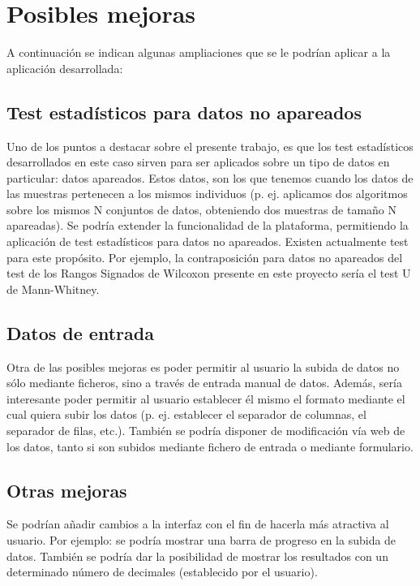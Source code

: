 \section{Posibles mejoras}

A continuación se indican algunas ampliaciones que se le podrían aplicar a la aplicación desarrollada:

\subsection{Test estadísticos para datos no apareados}
Uno de los puntos a destacar sobre el presente trabajo, es que los test estadísticos desarrollados en este caso sirven para ser aplicados sobre un tipo de datos en particular: datos apareados. Estos datos, son los que tenemos cuando los datos de las muestras pertenecen a los mismos individuos (p. ej. aplicamos dos algoritmos sobre los mismos N conjuntos de datos, obteniendo dos muestras de tamaño N apareadas). Se podría extender la funcionalidad de la plataforma, permitiendo la aplicación de test estadísticos para datos no apareados. Existen actualmente test para este propósito. Por ejemplo, la contraposición para datos no apareados del test de los Rangos Signados de Wilcoxon presente en este proyecto sería el test U de Mann-Whitney.

\subsection{Datos de entrada}
Otra de las posibles mejoras es poder permitir al usuario la subida de datos no sólo mediante ficheros, sino a través de entrada manual de datos. Además, sería interesante poder permitir al usuario establecer él mismo el formato mediante el cual quiera subir los datos (p. ej. establecer el separador de columnas, el separador de filas, etc.). También se podría disponer de modificación vía web de los datos, tanto si son subidos mediante fichero de entrada o mediante formulario.

\subsection{Otras mejoras}
Se podrían añadir cambios a la interfaz con el fin de hacerla más atractiva al usuario. Por ejemplo: se podría mostrar una barra de progreso en la subida de datos. También se podría dar la posibilidad de mostrar los resultados con un determinado número de decimales (establecido por el usuario).